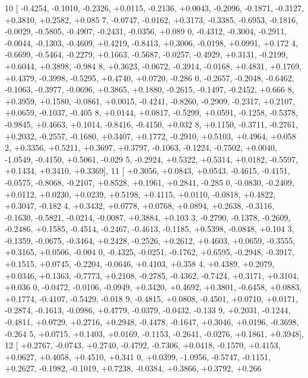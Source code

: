 \begin{DoxyCode}
10 [ -0.4254, -0.1010, -0.2326, +0.0115, -0.2136, +0.0043, -0.2096, -0.1871, -0.3127, +0.3810, +0.2582, +0.085
      7, -0.0747, -0.0162, +0.3173, -0.3385, -0.6953, -0.1816, -0.0029, -0.5805, -0.4907, -0.2431, -0.0356, +0.089
      0, -0.4312, -0.3004, -0.2911, -0.0044, -0.1303, -0.4609, +0.4219, -0.8413, +0.3006, -0.0198, +0.0991, +0.172
      4, -0.6699, -0.5464, -0.2279, +0.1663, -0.5687, -0.0257, -0.4929, +0.3131, -0.2199, +0.6044, +0.3898, -0.984
      8, +0.3623, -0.0672, -0.3914, -0.0168, +0.4831, +0.1769, +0.4379, -0.3998, -0.5295, +0.4740, +0.0720, -0.286
      0, -0.2657, -0.2048, -0.6462, -0.1063, -0.3977, -0.0696, +0.3865, +0.1880, -0.2615, -0.1497, -0.2452, +0.666
      8, +0.3959, +0.1580, -0.0861, +0.0015, -0.4241, -0.8260, -0.2909, -0.2317, +0.2107, +0.0659, -0.1037, -0.405
      8, +0.0144, +0.0817, -0.5299, +0.0591, -0.1258, -0.5378, -0.9845, +0.4663, +0.1014, -0.8416, -0.4150, +0.032
      8, +0.1150, -0.3711, -0.2761, +0.2032, -0.2557, -0.1680, +0.3407, +0.1772, -0.2910, +0.5103, +0.4964, +0.058
      2, +0.3356, +0.5211, +0.3697, +0.3797, -0.1063, -0.1224, -0.7502, +0.0040, -1.0549, -0.4150, +0.5061, -0.029
      5, -0.2924, +0.5322, +0.5314, +0.0182, -0.5597, +0.1434, +0.3410, +0.3369],
11 [ +0.3056, +0.0843, +0.0543, -0.4615, -0.4151, -0.0575, -0.8068, -0.2107, +0.8528, +0.1961, +0.2841, -0.285
      0, -0.0830, -0.2409, +0.0112, +0.0230, +0.0239, +0.5198, +0.4115, +0.0110, -0.0818, +0.4822, +0.3047, -0.182
      4, +0.3432, +0.0778, +0.0768, +0.0894, +0.2638, -0.3116, -0.1630, -0.5821, -0.0214, -0.0087, +0.3884, +0.103
      3, -0.2790, -0.1378, -0.2609, -0.2486, +0.1585, -0.4514, -0.2467, -0.4613, -0.1185, +0.5398, -0.0848, +0.104
      3, -0.1359, -0.0675, -0.3464, +0.2428, -0.2526, +0.2612, +0.4603, +0.0659, -0.3555, +0.3165, +0.0506, -0.004
      0, -0.4325, -0.0251, -0.1762, +0.6595, -0.2948, -0.3917, +0.1515, +0.0745, -0.2204, -0.0646, +0.4103, +0.358
      4, +0.4389, +0.2079, +0.0346, +0.1363, -0.7773, +0.2108, -0.2785, -0.4362, -0.7424, +0.3171, +0.3104, +0.036
      0, -0.0472, -0.0106, -0.0949, +0.3420, +0.4692, +0.3801, -0.6458, +0.0883, +0.1774, -0.4107, -0.5429, -0.018
      9, -0.4815, +0.0808, -0.4501, +0.0710, +0.0171, -0.2874, -0.1613, -0.0986, +0.4779, -0.0379, -0.0432, -0.133
      9, +0.2031, -0.1244, -0.4811, +0.0729, +0.2716, +0.2948, -0.4478, -0.1647, +0.3046, +0.0196, -0.3698, -0.264
      5, +0.0715, +0.1403, +0.0169, -0.1153, -0.2641, -0.0276, +0.1861, +0.3948],
12 [ +0.2767, -0.0743, +0.2740, -0.4792, -0.7306, +0.0418, -0.1570, +0.4153, +0.0627, +0.4058, +0.4510, +0.341
      0, +0.0399, -1.0956, -0.5747, -0.1151, +0.2627, -0.1982, -0.1019, +0.7238, -0.0384, +0.3866, +0.3792, +0.266

\end{DoxyCode}
